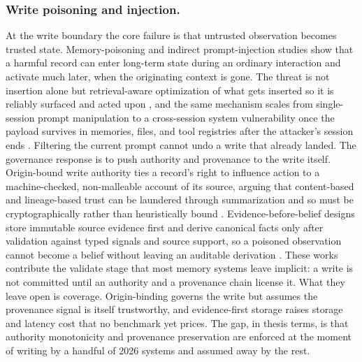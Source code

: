 \subsubsection{Write poisoning and injection.}
At the write boundary the core failure is that untrusted observation becomes trusted state. Memory-poisoning and indirect prompt-injection studies show that a harmful record can enter long-term state during an ordinary interaction and activate much later, when the originating context is gone. The threat is not insertion alone but retrieval-aware optimization of what gets inserted so it is reliably surfaced and acted upon \citep{dash2026memorypoisoning}, and the same mechanism scales from single-session prompt manipulation to a cross-session system vulnerability once the payload survives in memories, files, and tool registries after the attacker's session ends \citep{xie2026crosssessioninjection}. Filtering the current prompt cannot undo a write that already landed. The governance response is to push authority and provenance to the write itself. Origin-bound write authority ties a record's right to influence action to a machine-checked, non-malleable account of its source, arguing that content-based and lineage-based trust can be laundered through summarization and so must be cryptographically rather than heuristically bound \citep{louck2026originbound}. Evidence-before-belief designs store immutable source evidence first and derive canonical facts only after validation against typed signals and source support, so a poisoned observation cannot become a belief without leaving an auditable derivation \citep{joshi2026eywa}. These works contribute the validate stage that most memory systems leave implicit: a write is not committed until an authority and a provenance chain license it. What they leave open is coverage. Origin-binding governs the write but assumes the provenance signal is itself trustworthy, and evidence-first storage raises storage and latency cost that no benchmark yet prices. The gap, in thesis terms, is that authority monotonicity and provenance preservation are enforced at the moment of writing by a handful of 2026 systems and assumed away by the rest.

